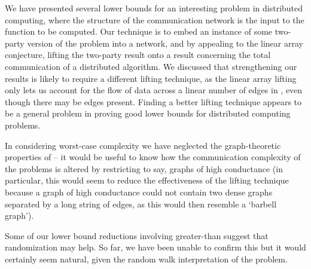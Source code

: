 \documentclass[twocolumn]{article}
\begin{document}
We have presented several lower bounds for an interesting problem in distributed computing, where the structure of the communication network is the input to the function to be computed. Our technique is to embed an instance of some two-party version of the problem into a network, and by appealing to the linear array conjecture, lifting the two-party result onto a result concerning the total communication of a distributed algorithm. We discussed that strengthening our results is likely to require a different lifting technique, as the linear array lifting only lets us account for the flow of data across a linear number of edges in , even though there may be  edges present. Finding a better lifting technique appears to be a general problem in proving good lower bounds for distributed computing problems.

In considering worst-case complexity we have neglected the graph-theoretic properties of  -- it would be useful to know how the communication complexity of the problems is altered by restricting  to say, graphs of high conductance (in particular, this would seem to reduce the effectiveness of the lifting technique because a graph of high conductance could not contain two dense graphs separated by a long string of edges, as this would then resemble a `barbell graph').

Some of our lower bound reductions involving greater-than suggest that randomization may help. So far, we have been unable to confirm this but it would certainly seem natural, given the random walk interpretation of the problem.
 
\end{document}
